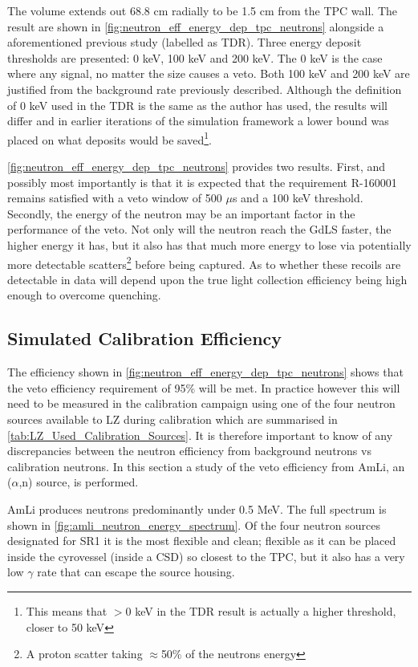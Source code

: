 The volume extends out 68.8 cm radially to be 1.5 cm from the TPC wall.
The result are shown in \autoref{fig:neutron_eff_energy_dep_tpc_neutrons} alongside a aforementioned previous study (labelled as TDR).
Three energy deposit thresholds are presented: 0 keV, 100 keV and 200 keV.
The 0 keV is the case where any signal, no matter the size causes a veto.
Both 100 keV and 200 keV are justified from the background rate previously described.
Although the definition of 0 keV used in the TDR is the same as the author has used, the results will differ and in earlier iterations of the simulation framework a lower bound was placed on what deposits would be saved\footnote{This means that $>$0 keV in the TDR result is actually a higher threshold, closer to 50 keV}.



\par
\autoref{fig:neutron_eff_energy_dep_tpc_neutrons} provides two results.
First, and possibly most importantly is that it is expected that the requirement R-160001 remains satisfied with a veto window of 500 $\mu$s and a 100 keV threshold.
Secondly, the energy of the neutron may be an important factor in the performance of the veto.
Not only will the neutron reach the GdLS faster, the higher energy it has, but it also has that much more energy to lose via potentially more detectable scatters\footnote{A proton scatter taking $\approx$50\% of the neutrons energy} before being captured.
As to whether these recoils are detectable in data will depend upon the true light collection efficiency being high enough to overcome quenching.

\subsection{Simulated Calibration Efficiency}
\par
The efficiency shown in \autoref{fig:neutron_eff_energy_dep_tpc_neutrons} shows that the veto efficiency requirement of 95\% will be met.
In practice however this will need to be measured in the calibration campaign using one of the four neutron sources available to LZ during calibration which are summarised in \autoref{tab:LZ_Used_Calibration_Sources}.
It is therefore important to know of any discrepancies between the neutron efficiency from background neutrons vs calibration neutrons.
In this section a study of the veto efficiency from AmLi, an ($\alpha$,n) source, is performed.
\par
AmLi produces neutrons predominantly under 0.5 MeV.
The full spectrum is shown in \autoref{fig:amli_neutron_energy_spectrum}.
Of the four neutron sources designated for SR1 it is the most flexible and clean; flexible as it can be placed inside the cyrovessel (inside a CSD) so closest to the TPC, but it also has a very low $\gamma$ rate that can escape the source housing.

